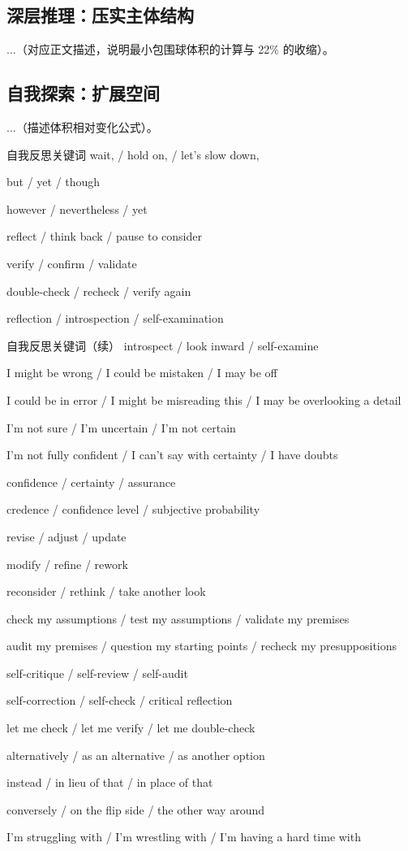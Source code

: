 \subsection{深层推理：压实主体结构}
...（对应正文描述，说明最小包围球体积的计算与 22\% 的收缩）。

\subsection{自我探索：扩展空间}
...（描述体积相对变化公式）。

\begin{PromptBox}{自我反思关键词}
wait, / hold on, / let's slow down,

but / yet / though

however / nevertheless / yet

reflect / think back / pause to consider

verify / confirm / validate

double-check / recheck / verify again

reflection / introspection / self-examination
\end{PromptBox}
\begin{PromptBox}{自我反思关键词（续）}
introspect / look inward / self-examine

I might be wrong / I could be mistaken / I may be off

I could be in error / I might be misreading this / I may be overlooking a detail

I'm not sure / I'm uncertain / I'm not certain

I'm not fully confident / I can't say with certainty / I have doubts

confidence / certainty / assurance

credence / confidence level / subjective probability

revise / adjust / update

modify / refine / rework

reconsider / rethink / take another look

check my assumptions / test my assumptions / validate my premises

audit my premises / question my starting points / recheck my presuppositions

self-critique / self-review / self-audit

self-correction / self-check / critical reflection

let me check / let me verify / let me double-check

alternatively / as an alternative / as another option

instead / in lieu of that / in place of that

conversely / on the flip side / the other way around

I'm struggling with / I’m wrestling with / I’m having a hard time with

\end{PromptBox}

